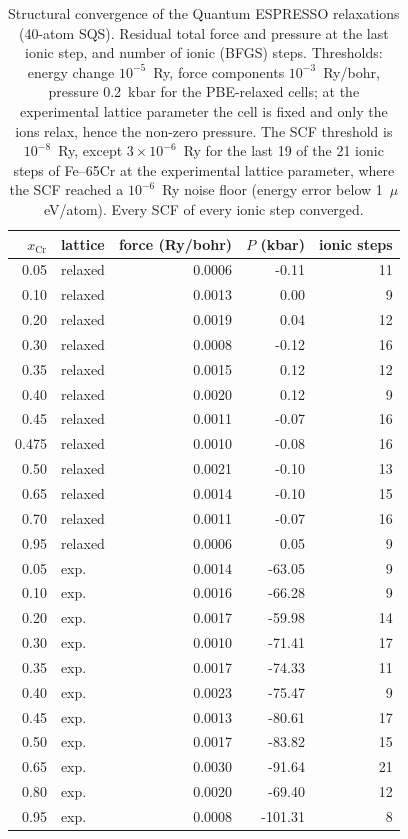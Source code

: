 \begin{table}[!htbp]
\centering
\caption{Structural convergence of the Quantum ESPRESSO relaxations (40-atom SQS). Residual total force and pressure at
the last ionic step, and number of ionic (BFGS) steps. Thresholds: energy change $10^{-5}$~Ry, force components
$10^{-3}$~Ry/bohr, pressure 0.2~kbar for the PBE-relaxed cells; at the experimental lattice parameter the cell is fixed
and only the ions relax, hence the non-zero pressure. The SCF threshold is $10^{-8}$~Ry, except $3\times10^{-6}$~Ry for
the last 19 of the 21 ionic steps of Fe--65Cr at the experimental lattice parameter, where the SCF reached a $10^{-6}$~Ry noise floor (energy error below
1~$\mu$eV/atom). Every SCF of every ionic step converged.}
\label{tab:S_structural_convergence}
\small
\begin{tabular}{rlrrr}
\hline
$x_{\mathrm{Cr}}$ & lattice & force (Ry/bohr) & $P$ (kbar) & ionic steps \\
\hline
0.05 & relaxed & 0.0006 & -0.11 & 11 \\
0.10 & relaxed & 0.0013 & 0.00 & 9 \\
0.20 & relaxed & 0.0019 & 0.04 & 12 \\
0.30 & relaxed & 0.0008 & -0.12 & 16 \\
0.35 & relaxed & 0.0015 & 0.12 & 12 \\
0.40 & relaxed & 0.0020 & 0.12 & 9 \\
0.45 & relaxed & 0.0011 & -0.07 & 16 \\
0.475 & relaxed & 0.0010 & -0.08 & 16 \\
0.50 & relaxed & 0.0021 & -0.10 & 13 \\
0.65 & relaxed & 0.0014 & -0.10 & 15 \\
0.70 & relaxed & 0.0011 & -0.07 & 16 \\
0.95 & relaxed & 0.0006 & 0.05 & 9 \\
0.05 & exp. & 0.0014 & -63.05 & 9 \\
0.10 & exp. & 0.0016 & -66.28 & 9 \\
0.20 & exp. & 0.0017 & -59.98 & 14 \\
0.30 & exp. & 0.0010 & -71.41 & 17 \\
0.35 & exp. & 0.0017 & -74.33 & 11 \\
0.40 & exp. & 0.0023 & -75.47 & 9 \\
0.45 & exp. & 0.0013 & -80.61 & 17 \\
0.50 & exp. & 0.0017 & -83.82 & 15 \\
0.65 & exp. & 0.0030 & -91.64 & 21 \\
0.80 & exp. & 0.0020 & -69.40 & 12 \\
0.95 & exp. & 0.0008 & -101.31 & 8 \\
\hline
\end{tabular}
\end{table}
